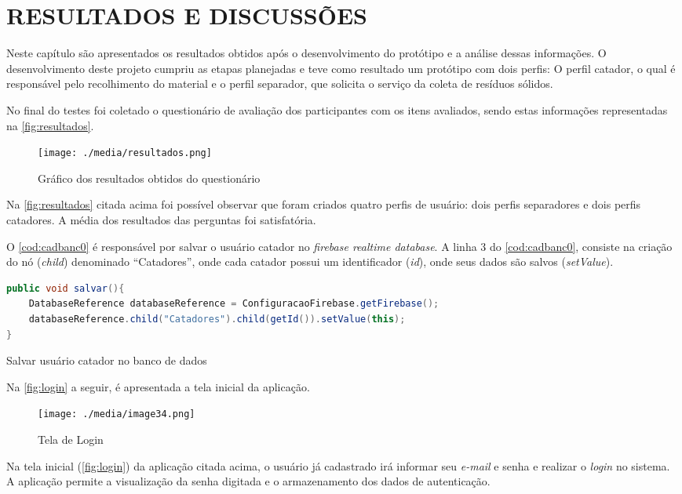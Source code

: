 
\chapter{RESULTADOS E DISCUSSÕES}
\label{cap:resultados}
 Neste capítulo são apresentados os resultados obtidos após o desenvolvimento do protótipo e a análise dessas informações. O desenvolvimento deste projeto cumpriu as etapas planejadas e teve como resultado um protótipo com dois perfis: O perfil catador, o qual é responsável pelo recolhimento do material e o perfil separador, que solicita o serviço da coleta de resíduos sólidos.

No final do testes foi coletado o questionário de avaliação dos participantes com os itens avaliados, sendo estas informações representadas na \autoref{fig:resultados}.

\begin{figure}[H]
	\begin{Center}
		\texttt{[image: ./media/resultados.png]}
	\end{Center}
\caption{Gráfico dos resultados obtidos do questionário}
\label{fig:resultados}
\end{figure}

Na \autoref{fig:resultados} citada acima foi possível observar que foram criados quatro perfis de usuário: dois perfis separadores e dois perfis catadores. A média dos resultados das perguntas foi satisfatória.

O \autoref{cod:cadbanc0} é responsável por salvar o usuário catador no \textit{firebase realtime database}. A linha 3 do \autoref{cod:cadbanc0}, consiste na criação do nó (\textit{child}) denominado “Catadores”, onde cada catador possui um identificador (\textit{id}), onde seus dados são salvos (\textit{setValue}).

\begin{codigo}[H]
\begin{lstlisting}[language=Java]
public void salvar(){
    DatabaseReference databaseReference = ConfiguracaoFirebase.getFirebase();
    databaseReference.child("Catadores").child(getId()).setValue(this);
}
\end{lstlisting}
\caption{Salvar usuário catador no banco de dados}
\label{cod:cadbanc0}
\end{codigo}


Na \autoref{fig:login} a seguir, é apresentada a tela inicial da aplicação. 

\begin{figure}[H]
	\begin{Center}
		\texttt{[image: ./media/image34.png]}
	\end{Center}
\caption{Tela de Login}
\label{fig:login}
\end{figure}
Na tela inicial (\autoref{fig:login}) da aplicação citada acima, o usuário já cadastrado irá informar seu \textit{e-mail} e senha e realizar o \textit{login} no sistema. A aplicação permite a visualização da senha digitada e o armazenamento dos dados de autenticação.
